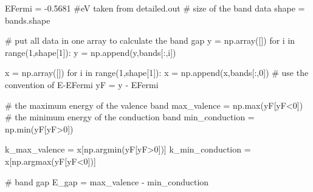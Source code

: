 \documentclass[
  letterpaper,
]{article}
\newenvironment{Shaded}{\begin{snugshade}}{\end{snugshade}}
\newcommand{\BuiltInTok}[1]{\textcolor[rgb]{0.00,0.23,0.31}{#1}}
\newcommand{\CommentTok}[1]{\textcolor[rgb]{0.37,0.37,0.37}{#1}}
\newcommand{\ControlFlowTok}[1]{\textcolor[rgb]{0.00,0.23,0.31}{#1}}
\newcommand{\DecValTok}[1]{\textcolor[rgb]{0.68,0.00,0.00}{#1}}
\newcommand{\FloatTok}[1]{\textcolor[rgb]{0.68,0.00,0.00}{#1}}
\newcommand{\KeywordTok}[1]{\textcolor[rgb]{0.00,0.23,0.31}{#1}}
\newcommand{\NormalTok}[1]{\textcolor[rgb]{0.00,0.23,0.31}{#1}}
\newcommand{\OperatorTok}[1]{\textcolor[rgb]{0.37,0.37,0.37}{#1}}
\begin{document}
\begin{Shaded}
\begin{Highlighting}[]
\NormalTok{EFermi }\OperatorTok{=} \OperatorTok{{-}}\FloatTok{0.5681} \CommentTok{\#eV taken from detailed.out}
\CommentTok{\# size of the band data}
\NormalTok{shape }\OperatorTok{=}\NormalTok{ bands.shape}

\CommentTok{\# put all data in one array to calculate the band gap}
\NormalTok{y }\OperatorTok{=}\NormalTok{ np.array([])}
\ControlFlowTok{for}\NormalTok{ i }\KeywordTok{in} \BuiltInTok{range}\NormalTok{(}\DecValTok{1}\NormalTok{,shape[}\DecValTok{1}\NormalTok{]):}
\NormalTok{    y }\OperatorTok{=}\NormalTok{ np.append(y,bands[:,i])}

\NormalTok{x }\OperatorTok{=}\NormalTok{ np.array([])}
\ControlFlowTok{for}\NormalTok{ i }\KeywordTok{in} \BuiltInTok{range}\NormalTok{(}\DecValTok{1}\NormalTok{,shape[}\DecValTok{1}\NormalTok{]):}
\NormalTok{    x }\OperatorTok{=}\NormalTok{ np.append(x,bands[:,}\DecValTok{0}\NormalTok{])}
\CommentTok{\# use the convention of E{-}EFermi  }
\NormalTok{yF }\OperatorTok{=}\NormalTok{ y }\OperatorTok{{-}}\NormalTok{ EFermi}

\CommentTok{\# the maximum energy of the valence band}
\NormalTok{max\_valence }\OperatorTok{=}\NormalTok{ np.}\BuiltInTok{max}\NormalTok{(yF[yF}\OperatorTok{\textless{}}\DecValTok{0}\NormalTok{])}
\CommentTok{\# the minimum energy of the conduction band}
\NormalTok{min\_conduction }\OperatorTok{=}\NormalTok{ np.}\BuiltInTok{min}\NormalTok{(yF[yF}\OperatorTok{\textgreater{}}\DecValTok{0}\NormalTok{])}

\NormalTok{k\_max\_valence }\OperatorTok{=}\NormalTok{ x[np.argmin(yF[yF}\OperatorTok{\textgreater{}}\DecValTok{0}\NormalTok{])]}
\NormalTok{k\_min\_conduction }\OperatorTok{=}\NormalTok{ x[np.argmax(yF[yF}\OperatorTok{\textless{}}\DecValTok{0}\NormalTok{])]}

\CommentTok{\# band gap}
\NormalTok{E\_gap }\OperatorTok{=}\NormalTok{ max\_valence }\OperatorTok{{-}}\NormalTok{ min\_conduction}
\end{Highlighting}
\end{Shaded}
\end{document}

